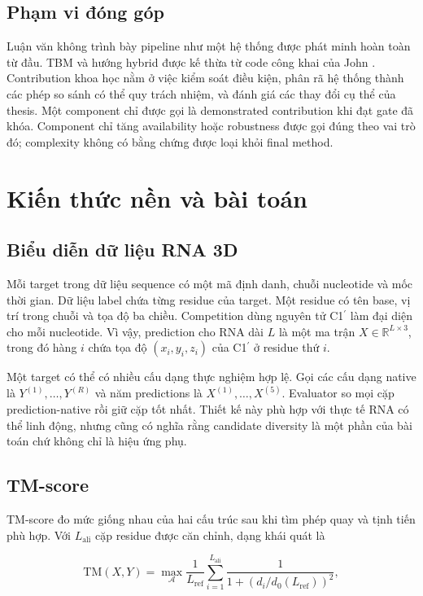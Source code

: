 \documentclass[12pt,a4paper,oneside]{report}
\newcommand{\cprime}{C1$^{\prime}$}
\begin{document}
\section{Phạm vi đóng góp}

Luận văn không trình bày pipeline như một hệ thống được phát minh hoàn toàn từ đầu.
TBM và hướng hybrid được kế thừa từ code công khai của John
\cite{kaggle_top1,kaggle_hybrid}. Contribution khoa học nằm ở việc kiểm soát điều kiện,
phân rã hệ thống thành các phép so sánh có thể quy trách nhiệm, và đánh giá các thay đổi
cụ thể của thesis. Một component chỉ được gọi là demonstrated contribution khi đạt gate
đã khóa. Component chỉ tăng availability hoặc robustness được gọi đúng theo vai trò đó;
complexity không có bằng chứng được loại khỏi final method.

\chapter{Kiến thức nền và bài toán}

\section{Biểu diễn dữ liệu RNA 3D}

Mỗi target trong dữ liệu sequence có một mã định danh, chuỗi nucleotide và mốc thời
gian. Dữ liệu label chứa từng residue của target. Một residue có tên base, vị trí trong
chuỗi và tọa độ ba chiều. Competition dùng nguyên tử \cprime{} làm đại diện cho mỗi
nucleotide. Vì vậy, prediction cho RNA dài $L$ là một ma trận
$X\in\mathbb{R}^{L\times 3}$, trong đó hàng $i$ chứa tọa độ $(x_i,y_i,z_i)$ của
\cprime{} ở residue thứ $i$.

Một target có thể có nhiều cấu dạng thực nghiệm hợp lệ. Gọi các cấu dạng native là
$Y^{(1)},\ldots,Y^{(R)}$ và năm predictions là $X^{(1)},\ldots,X^{(5)}$. Evaluator so
mọi cặp prediction-native rồi giữ cặp tốt nhất. Thiết kế này phù hợp với thực tế RNA
có thể linh động, nhưng cũng có nghĩa rằng candidate diversity là một phần của bài
toán chứ không chỉ là hiệu ứng phụ.

\section{TM-score}

TM-score đo mức giống nhau của hai cấu trúc sau khi tìm phép quay và tịnh tiến phù hợp.
Với $L_{\mathrm{ali}}$ cặp residue được căn chỉnh, dạng khái quát là

\begin{equation}
\mathrm{TM}(X,Y)=\max_{\mathcal{A}}
\frac{1}{L_{\mathrm{ref}}}
\sum_{i=1}^{L_{\mathrm{ali}}}
\frac{1}{1+\left(d_i/d_0(L_{\mathrm{ref}})\right)^2},
\end{equation}
\end{document}
